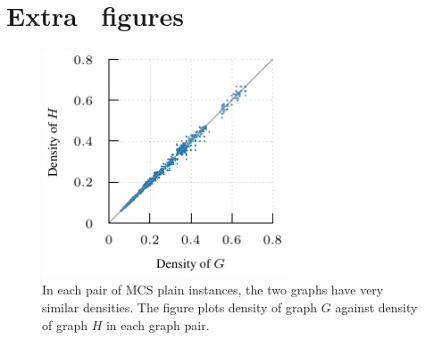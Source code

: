 \chapter{Extra \McSplit\ figures}
\label{a:appendix-extra-mcsplit}

\begin{figure}[h!]
    \centering
    \includegraphics*[width=0.65\textwidth]{14-mcsplit-i-undirected/modified-mcsplit-experiment/plots/plots/mcsplain-densities}
    \caption{In each pair of MCS plain instances, the two graphs have very similar densities. The figure
        plots density of graph $G$ against density of graph $H$ in each graph pair.}
    \label{figure:mcsplain-densities}
\end{figure}

